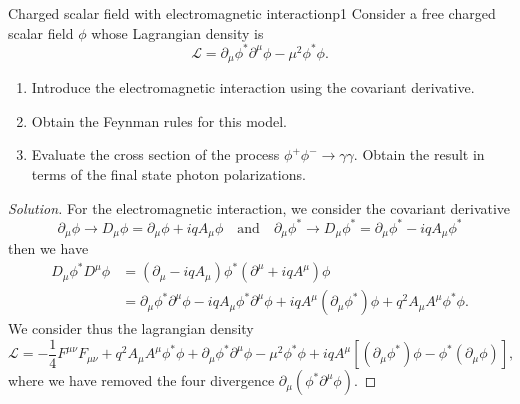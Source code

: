 \begin{problem}{Charged scalar field with electromagnetic interaction}{p1}
   Consider a free charged scalar field \(\phi\) whose Lagrangian density is
   \begin{equation*}
      \mathcal{L} = \partial_\mu \phi^* \partial^\mu \phi - \mu^2 \phi^* \phi.
   \end{equation*}
   \begin{enumerate}[label=(\alph*)]
       \item Introduce the electromagnetic interaction using the covariant derivative.
       \item Obtain the Feynman rules for this model.
       \item Evaluate the cross section of the process \(\phi^+ \phi^- \to \gamma \gamma.\) Obtain the result in terms of the final state photon polarizations.
   \end{enumerate}
\end{problem}
\begin{proof}[Solution]
   For the electromagnetic interaction, we consider the covariant derivative
   \begin{equation*}
       \partial_\mu\phi \to D_\mu\phi = \partial_\mu\phi + iq A_\mu\phi
       \quad\text{and}\quad
       \partial_\mu \phi^* \to D_\mu \phi^* = \partial_\mu \phi^* - iq A_\mu\phi^*
   \end{equation*}
   then we have
   \begin{align*}
      D_\mu \phi^* D^\mu \phi &= (\partial_\mu - iq A_\mu)\phi^* (\partial^\mu + iq A^\mu) \phi\\
                              &= \partial_\mu\phi^* \partial^\mu \phi - iq A_\mu \phi^* \partial^\mu \phi + iq A^\mu(\partial_\mu \phi^*)\phi + q^2 A_\mu A^\mu \phi^* \phi.
   \end{align*}
   We consider thus the lagrangian density
   \begin{equation*}
      \mathcal{L} = -\frac14 F^{\mu\nu}F_{\mu\nu} + q^2 A_\mu A^\mu \phi^*\phi + \partial_\mu \phi^*\partial^\mu \phi - \mu^2\phi^*\phi + iq A^\mu \left[(\partial_\mu \phi^*)\phi - \phi^*(\partial_\mu\phi)\right],
   \end{equation*}
   where we have removed the four divergence \(\partial_\mu(\phi^* \partial^\mu \phi).\)
\end{proof}

